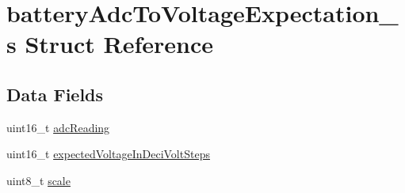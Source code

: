 \hypertarget{structbatteryAdcToVoltageExpectation__s}{\section{battery\+Adc\+To\+Voltage\+Expectation\+\_\+s Struct Reference}
\label{structbatteryAdcToVoltageExpectation__s}
}
\subsection*{Data Fields}
\begin{DoxyCompactItemize}
\item 
uint16\+\_\+t \hyperlink{structbatteryAdcToVoltageExpectation__s_a7e633e10db592bbe953e035f62d1118a}{adc\+Reading}
\item 
uint16\+\_\+t \hyperlink{structbatteryAdcToVoltageExpectation__s_a7e2b53232c5a8fbcf986d8996fb1c9d1}{expected\+Voltage\+In\+Deci\+Volt\+Steps}
\item 
uint8\+\_\+t \hyperlink{structbatteryAdcToVoltageExpectation__s_af05fc6e746d51248cc22f7758a1b7070}{scale}
\end{DoxyCompactItemize}


